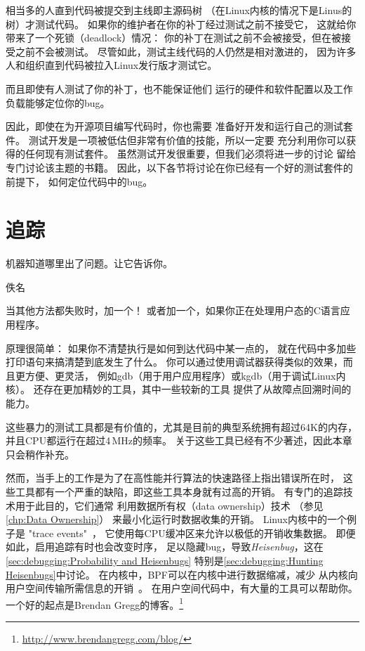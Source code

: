 相当多的人直到代码被提交到主线即主源码树
（在Linux内核的情况下是Linus的树）才测试代码。
如果你的维护者在你的补丁经过测试之前不接受它，
这就给你带来了一个死锁（deadlock）情况：
你的补丁在测试之前不会被接受，但在被接受之前不会被测试。
尽管如此，测试主线代码的人仍然是相对激进的，
因为许多人和组织直到代码被拉入Linux发行版才测试它。

而且即使有人测试了你的补丁，也不能保证他们
运行的硬件和软件配置以及工作负载能够定位你的bug。

因此，即使在为开源项目编写代码时，你也需要
准备好开发和运行自己的测试套件。
测试开发是一项被低估但非常有价值的技能，所以一定要
充分利用你可以获得的任何现有测试套件。
虽然测试开发很重要，但我们必须将进一步的讨论
留给专门讨论该主题的书籍。
因此，以下各节将讨论在你已经有一个好的测试套件的前提下，
如何定位代码中的bug。

\section{追踪}
\label{sec:debugging:Tracing}
%
\epigraph{机器知道哪里出了问题。让它告诉你。}{佚名}

当其他方法都失败时，加一个！
或者加一个，如果你正在处理用户态的C语言应用程序。

原理很简单：
如果你不清楚执行是如何到达代码中某一点的，
就在代码中多加些打印语句来搞清楚到底发生了什么。
你可以通过使用调试器获得类似的效果，而且更方便、更灵活，
例如gdb（用于用户应用程序）或kgdb（用于调试Linux内核）。
还存在更加精妙的工具，其中一些较新的工具
提供了从故障点回溯时间的能力。

这些暴力的测试工具都是有价值的，尤其是目前的典型系统拥有超过64K的内存，并且CPU都运行在超过4\,MHz的频率。
关于这些工具已经有不少著述，因此本章只会稍作补充。

然而，当手上的工作是为了在高性能并行算法的快速路径上指出错误所在时，
这些工具都有一个严重的缺陷，即这些工具本身就有过高的开销。
有专门的追踪技术用于此目的，它们通常
利用数据所有权（data ownership）技术
（参见\cref{chp:Data Ownership}）
来最小化运行时数据收集的开销。
Linux内核中的一个例子是
"trace events"~\cite{StevenRostedt2010perfTraceEventP1,StevenRostedt2010perfTraceEventP2,StevenRostedt2010perfTraceEventP3,StevenRostedt2010perfHP+DeathlyMacros}，
它使用每CPU缓冲区来允许以极低的开销收集数据。
即便如此，启用追踪有时也会改变时序，
足以隐藏bug，导致\emph{Heisenbug}，这在
\cref{sec:debugging:Probability and Heisenbugs}
特别是\cref{sec:debugging:Hunting Heisenbugs}中讨论。
在内核中，BPF可以在内核中进行数据缩减，减少
从内核向用户空间传输所需信息的开销~\cite{BrendanGregg2019BPFperftools}。
在用户空间代码中，有大量的工具可以帮助你。
一个好的起点是Brendan Gregg的博客。\footnote{
	\url{http://www.brendangregg.com/blog/}}

